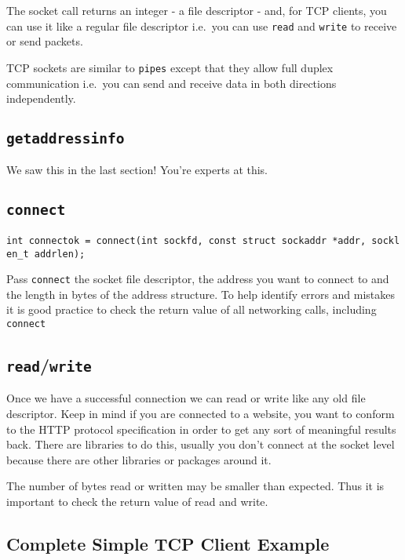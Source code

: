 The socket call returns an integer - a file descriptor - and, for TCP
clients, you can use it like a regular file descriptor i.e.~you can use
\texttt{read} and \texttt{write} to receive or send packets.

TCP sockets are similar to \texttt{pipes} except that they allow full
duplex communication i.e.~you can send and receive data in both
directions independently.

\subsection{\texorpdfstring{\texttt{getaddressinfo}}{getaddressinfo}}\label{getaddressinfo}

We saw this in the last section! You're experts at this.

\subsection{\texorpdfstring{\texttt{connect}}{connect}}\label{connect}

\texttt{int\ connectok\ =\ connect(int\ sockfd,\ const\ struct\ sockaddr\ *addr,\ socklen\_t\ addrlen);}

Pass \texttt{connect} the socket file descriptor, the address you want
to connect to and the length in bytes of the address structure. To help
identify errors and mistakes it is good practice to check the return
value of all networking calls, including \texttt{connect}

\subsection{\texorpdfstring{\texttt{read}/\texttt{write}}{read/write}}\label{readwrite}

Once we have a successful connection we can read or write like any old
file descriptor. Keep in mind if you are connected to a website, you
want to conform to the HTTP protocol specification in order to get any
sort of meaningful results back. There are libraries to do this, usually
you don't connect at the socket level because there are other libraries
or packages around it.

The number of bytes read or written may be smaller than expected. Thus
it is important to check the return value of read and write.

\subsection{Complete Simple TCP Client
Example}\label{complete-simple-tcp-client-example}

